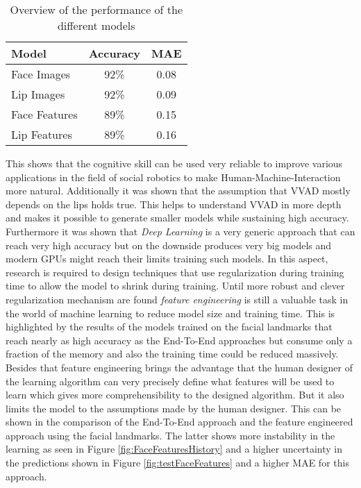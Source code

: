 \begin{table}[h!]
\centering
\begin{tabular}{|l|c|c|}
\hline
\textbf{Model} & \textbf{Accuracy} & \textbf{MAE} \\
\hline
Face Images & 92\% & 0.08 \\
\hline
Lip Images & 92\% & 0.09 \\
\hline
Face Features &  89\% & 0.15 \\
\hline
Lip Features & 89\% & 0.16 \\
\hline
\end{tabular}
\caption{Overview of the performance of the different models}
\label{tb:accuracies}
\end{table}

This shows that the cognitive skill can be used very reliable to improve various applications in the field of social robotics to make Human-Machine-Interaction more natural.
Additionally it was shown that the assumption that VVAD mostly depends on the lips holds true.
This helps to understand VVAD in more depth and makes it possible to generate smaller models while sustaining high accuracy.
Furthermore it was shown that \emph{Deep Learning} is a very generic approach that can reach very high accuracy but on the downside produces very big models and modern GPUs might reach their limits training such models.
In this aspect, research is required to design techniques that use regularization during training time to allow the model to shrink during training.
Until more robust and clever regularization mechanism are found \emph{feature engineering} is still a valuable task in the world of machine learning to reduce model size and training time.
This is highlighted by the results of the models trained on the facial landmarks that reach nearly as high accuracy as the End-To-End approaches but consume only a fraction of the memory and also the training time could be reduced massively.
Besides that feature engineering brings the advantage that the human designer of the learning algorithm can very precisely define what features will be used to learn which gives more comprehensibility to the designed algorithm.
But it also limits the model to the assumptions made by the human designer.
This can be shown in the comparison of the End-To-End approach and the feature engineered approach using the facial landmarks.
The latter shows more instability in the learning as seen in Figure \ref{fig:FaceFeaturesHistory} and a higher uncertainty in the predictions shown in Figure \ref{fig:testFaceFeatures} and a higher MAE for this approach.
